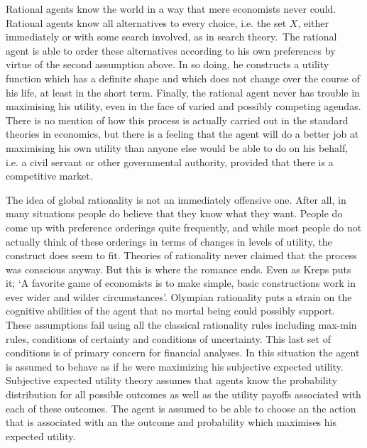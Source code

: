\documentclass{ucthesis}
\begin{document}
Rational agents know the world in a way that mere economists never could.
Rational agents know all alternatives to every choice, i.e. the set $X$,
either immediately or with some search involved, as in search theory.\ The
rational agent is able to order these alternatives according to his own
preferences by virtue of the second assumption above. In so doing, he
constructs a utility function which has a definite shape and which does not
change over the course of his life, at least in the short term. Finally, the
rational agent never has trouble in maximising his utility, even in the face
of varied and possibly competing agendas. There is no mention of how this
process is actually carried out in the standard theories in economics, but
there is a feeling that the agent will do a better job at maximising his own
utility than anyone else would be able to do on his behalf, i.e. a civil
servant or other governmental authority, provided that there is a
competitive market.

The idea of global rationality is not an immediately offensive one. After
all, in many situations people do believe that they know what they want.
People do come up with preference orderings quite frequently, and while most
people do not actually think of these orderings in terms of changes in
levels of utility, the construct does seem to fit. Theories of rationality
never claimed that the process was conscious anyway. But this is where the
romance ends. Even as Kreps \cite[1990, pp. 19]{Kreps 1990} puts it; `A
favorite game of economists is to make simple, basic constructions work in
ever wider and wilder circumstances'. Olympian rationality puts a strain on
the cognitive abilities of the agent that no mortal being could possibly
support. These assumptions fail using all the classical rationality rules
including max-min rules, conditions of certainty and conditions of
uncertainty. This last set of conditions is of primary concern for financial
analyses. In this situation the agent is assumed to behave as if he were
maximizing his subjective expected utility. Subjective expected utility
theory assumes that agents know the probability distribution for all
possible outcomes as well as the utility payoffs associated with each of
these outcomes. The agent is assumed to be able to choose an the action that
is associated with an the outcome and probability which maximises his
expected utility.
\end{document}
